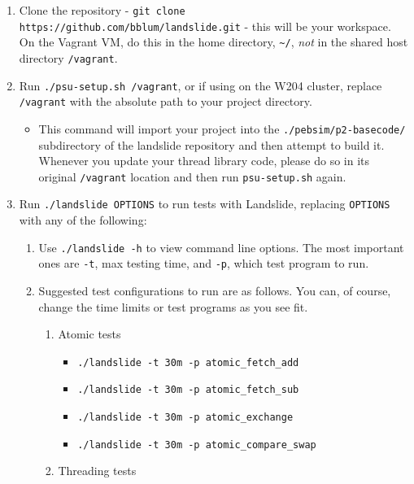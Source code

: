 \documentclass{article}
\begin{document}
\begin{enumerate}
	\item Clone the repository - {\tt git clone https://github.com/bblum/landslide.git} - this will be your workspace.
		On the Vagrant VM, do this in the home directory, {\tt \textasciitilde{}/},
		{\em not} in the shared host directory {\tt /vagrant}.
	\item Run {\tt ./psu-setup.sh /vagrant},
		or if using on the W204 cluster, replace {\tt /vagrant} with the absolute path to your project directory.
		\begin{itemize}
			\item This command will import your project into the {\tt ./pebsim/p2-basecode/} subdirectory of the landslide repository and then attempt to build it.
				Whenever you update your thread library code, please do so in its original {\tt /vagrant} location
				and then run {\tt psu-setup.sh} again.
		\end{itemize}
	\item Run {\tt ./landslide OPTIONS} to run tests with Landslide, replacing {\tt OPTIONS} with any of the following:
		\begin{enumerate}
			\item Use {\tt ./landslide -h} to view command line options. The most important ones are {\tt -t}, max testing
				time, and {\tt -p}, which test program to run.
			\item Suggested test configurations to run are as follows.
				You can, of course, change the time limits or test programs as you see fit.
				\begin{enumerate}
					\item Atomic tests
					\begin{itemize}
						\item \texttt{./landslide -t 30m -p atomic\_fetch\_add}
						\item \texttt{./landslide -t 30m -p atomic\_fetch\_sub}
						\item \texttt{./landslide -t 30m -p atomic\_exchange}
						\item \texttt{./landslide -t 30m -p atomic\_compare\_swap}
					\end{itemize}
					\item Threading tests

\end{enumerate}
\end{enumerate}
\end{enumerate}
\end{document}

